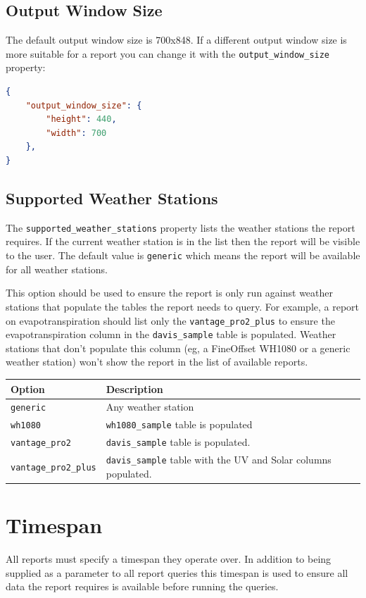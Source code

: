 \documentclass[a4paper,10pt]{book}
\begin{document}
\subsection{Output Window Size}
The default output window size is 700x848. If a different output window size is more suitable for a report you can change it with the \verb|output_window_size| property:

\begin{lstlisting}[language=json]
{
    "output_window_size": {
        "height": 440,
        "width": 700
    },
}
\end{lstlisting}

\subsection{Supported Weather Stations}
The \verb|supported_weather_stations| property lists the weather stations the report requires. If the current weather station is in the list then the report will be visible to the user. The default value is \verb|generic| which means the report will be available for all weather stations.

This option should be used to ensure the report is only run against weather stations that populate the tables the report needs to query. For example, a report on evapotranspiration should list only the \verb|vantage_pro2_plus| to ensure the evapotranspiration column in the \verb|davis_sample| table is populated. Weather stations that don't populate this column (eg, a FineOffset WH1080 or a generic weather station) won't show the report in the list of available reports.

\begin{tabular}{p{3.3cm} l}
\hline
\textbf{Option} & \textbf{Description} \\
\hline
\verb|generic| & Any weather station \\
\verb|wh1080| & \verb|wh1080_sample| table is populated\\
\verb|vantage_pro2| & \verb|davis_sample| table is populated.\\
\verb|vantage_pro2_plus| & \verb|davis_sample| table with the UV and Solar columns populated.\\
\hline
\end{tabular}


\section{Timespan}
All reports must specify a timespan they operate over. In addition to being supplied as a parameter to all report queries this timespan is used to ensure all data the report requires is available before running the queries.
\end{document}
